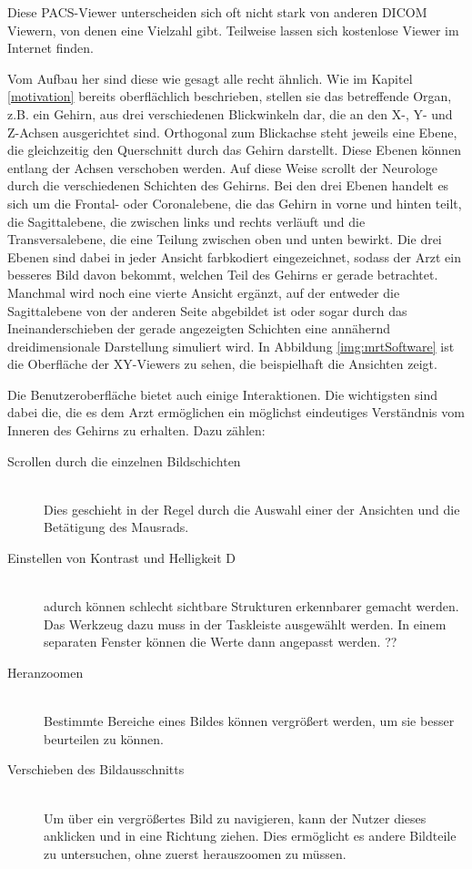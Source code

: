 Diese PACS-Viewer unterscheiden sich oft nicht stark von anderen DICOM Viewern, von denen eine Vielzahl gibt. Teilweise lassen sich kostenlose Viewer im Internet finden.

Vom Aufbau her sind diese wie gesagt alle recht ähnlich. 
Wie im Kapitel \ref{motivation} bereits oberflächlich beschrieben, stellen sie das betreffende Organ, z.B. ein Gehirn, aus drei verschiedenen Blickwinkeln dar, die an den X-, Y- und Z-Achsen ausgerichtet sind. Orthogonal zum Blickachse steht jeweils eine Ebene, die gleichzeitig den Querschnitt durch das Gehirn darstellt. Diese Ebenen können entlang der Achsen verschoben werden. Auf diese Weise scrollt der Neurologe durch die verschiedenen Schichten des Gehirns. 
Bei den drei Ebenen handelt es sich um die Frontal- oder Coronalebene, die das Gehirn in vorne und hinten teilt, die Sagittalebene, die zwischen links und rechts verläuft und die Transversalebene, die eine Teilung zwischen oben und unten bewirkt. 
Die drei Ebenen sind dabei in jeder Ansicht farbkodiert eingezeichnet, sodass der Arzt ein besseres Bild davon bekommt, welchen Teil des Gehirns er gerade betrachtet. 
Manchmal wird noch eine vierte Ansicht ergänzt, auf der entweder die Sagittalebene von der anderen Seite abgebildet ist oder sogar durch das Ineinanderschieben der gerade angezeigten Schichten eine annähernd dreidimensionale Darstellung simuliert wird. 
In Abbildung \ref{img:mrtSoftware} ist die Oberfläche der XY-Viewers zu sehen, die beispielhaft die Ansichten zeigt.

Die Benutzeroberfläche bietet auch einige Interaktionen. Die wichtigsten sind dabei die, die es dem Arzt ermöglichen ein möglichst eindeutiges Verständnis vom Inneren des Gehirns zu erhalten.  Dazu zählen:

\begin{description}
\item [Scrollen durch die einzelnen Bildschichten]\hfill \\
Dies geschieht in der Regel durch die Auswahl einer der Ansichten und die Betätigung des Mausrads. 
\item [Einstellen von Kontrast und Helligkeit D]\hfill \\
adurch können schlecht sichtbare Strukturen erkennbarer gemacht werden. Das Werkzeug dazu muss in der Taskleiste ausgewählt werden. In einem separaten Fenster können die Werte dann angepasst werden. ??
\item [Heranzoomen]\hfill \\
Bestimmte Bereiche eines Bildes können vergrößert werden, um sie besser beurteilen zu können.
\item [Verschieben des Bildausschnitts]\hfill \\
Um über ein vergrößertes Bild zu navigieren, kann der Nutzer dieses anklicken und in eine Richtung ziehen. Dies ermöglicht es andere Bildteile zu untersuchen, ohne zuerst herauszoomen zu müssen.
\end{description}

